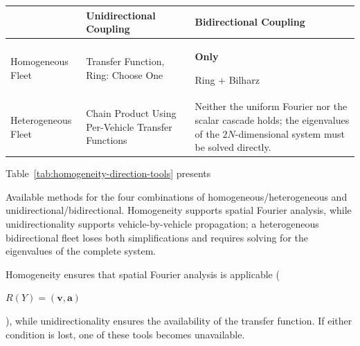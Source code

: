 \documentclass[11pt,a4paper,openany]{book}
\numberwithin{equation}{chapter}
\numberwithin{figure}{chapter}
\numberwithin{table}{chapter}
\newcommand{\tabletext}[2]{%
  \par\smallskip\noindent
  Table~\ref{#1} presents #2
\par\smallskip
}
\begin{document}
\begin{tcolorbox}[notebox,title=\textbf{Inference from Clue 3: Homogeneity and the direction of coupling determine which tool to use}]
\begin{center}
\small
{}
\label{tab:homogeneity-direction-tools}
\begin{tabular}{p{3.4cm}p{4.8cm}p{5.2cm}}
\toprule
& \textbf{Unidirectional Coupling} & \textbf{Bidirectional Coupling} \\
\midrule







Homogeneous Fleet




&




Transfer Function, Ring: Choose One




& \textbf{Only}




Ring $+$ Bilharz



\\[3pt]

Heterogeneous Fleet




&




Chain Product Using Per-Vehicle Transfer Functions& Neither the uniform Fourier nor the scalar cascade holds; the eigenvalues of the $2N$-dimensional system must be solved directly.



\\
\bottomrule
\end{tabular}
\end{center}
\tabletext{tab:homogeneity-direction-tools}{




Available methods for the four combinations of homogeneous/heterogeneous and unidirectional/bidirectional. Homogeneity supports spatial Fourier analysis, while unidirectionality supports vehicle-by-vehicle propagation; a heterogeneous bidirectional fleet loses both simplifications and requires solving for the eigenvalues of the complete system.
}







Homogeneity ensures that spatial Fourier analysis is applicable (





$R(Y)=(\bm v,\bm a)$

), while unidirectionality ensures the availability of the transfer function. If either condition is lost, one of these tools becomes unavailable.







\end{tcolorbox}
\end{document}
